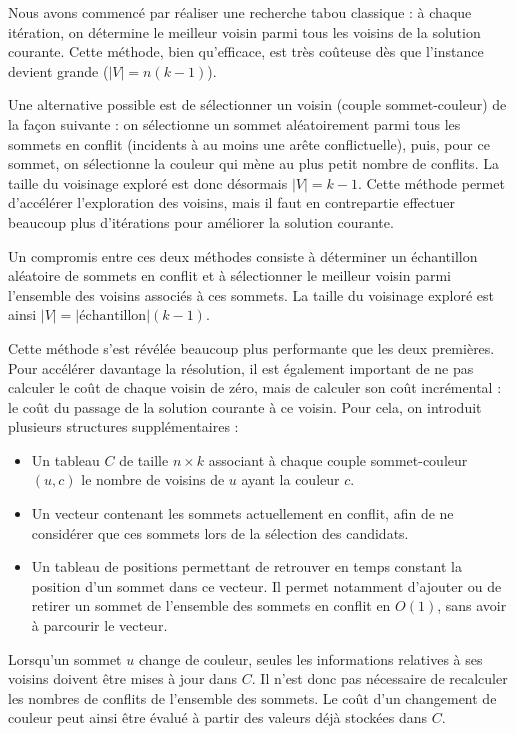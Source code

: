 \documentclass{article}
\begin{document}
Nous avons commencé par réaliser une recherche tabou classique : à chaque itération, on détermine le meilleur voisin parmi tous les voisins de la solution courante. Cette méthode, bien qu'efficace, est très coûteuse dès que l'instance devient grande ($|V| = n(k-1)$).

Une alternative possible est de sélectionner un voisin (couple sommet-couleur) de la façon suivante : on sélectionne un sommet aléatoirement parmi tous les sommets en conflit (incidents à au moins une arête conflictuelle), puis, pour ce sommet, on sélectionne la couleur qui mène au plus petit nombre de conflits. La taille du voisinage exploré est donc désormais $|V| = k-1$.
Cette méthode permet d'accélérer l'exploration des voisins, mais il faut en contrepartie effectuer beaucoup plus d'itérations pour améliorer la solution courante.

Un compromis entre ces deux méthodes consiste à déterminer un échantillon aléatoire de sommets en conflit et à sélectionner le meilleur voisin parmi l'ensemble des voisins associés à ces sommets.
La taille du voisinage exploré est ainsi $|V| = |\text{échantillon}|(k-1)$.

\noindent Cette méthode s'est révélée beaucoup plus performante que les deux premières.
\vspace{0.1 cm}\\

Pour accélérer davantage la résolution, il est également important de ne pas calculer le coût de chaque voisin de zéro, mais de calculer son coût incrémental : le coût du passage de la solution courante à ce voisin. Pour cela, on introduit plusieurs structures supplémentaires :
\begin{itemize}
    \item Un tableau $C$ de taille $n \times k$ associant à chaque couple sommet-couleur $(u,c)$ le nombre de voisins de $u$ ayant la couleur $c$.
    \item Un vecteur contenant les sommets actuellement en conflit, afin de ne considérer que ces sommets lors de la sélection des candidats.
    \item Un tableau de positions permettant de retrouver en temps constant la position d'un sommet dans ce vecteur. Il permet notamment d'ajouter ou de retirer un sommet de l'ensemble des sommets en conflit en $O(1)$, sans avoir à parcourir le vecteur.
\end{itemize}

\noindent Lorsqu'un sommet $u$ change de couleur, seules les informations relatives à ses voisins doivent être mises à jour dans $C$. Il n'est donc pas nécessaire de recalculer les nombres de conflits de l'ensemble des sommets. Le coût d'un changement de couleur peut ainsi être évalué à partir des valeurs déjà stockées dans $C$.
\end{document}
